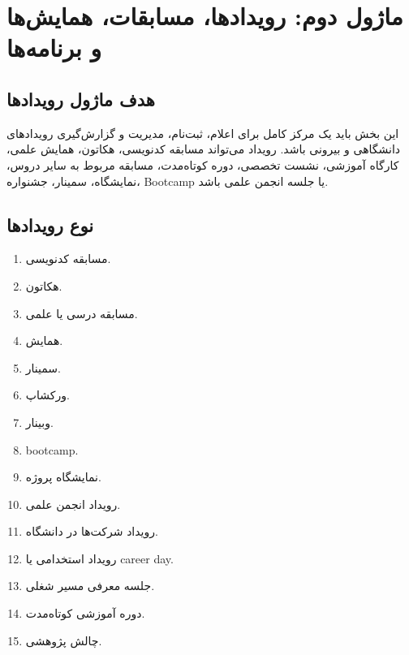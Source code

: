 \documentclass[12pt,a4paper]{article}
\begin{document}
\section{ماژول دوم: رویدادها، مسابقات، همایش‌ها و برنامه‌ها}

\subsection{هدف ماژول رویدادها}
این بخش باید یک مرکز کامل برای اعلام، ثبت‌نام، مدیریت و گزارش‌گیری رویدادهای دانشگاهی و بیرونی باشد. رویداد می‌تواند مسابقه کدنویسی، هکاتون، همایش علمی، کارگاه آموزشی، نشست تخصصی، دوره کوتاه‌مدت، مسابقه مربوط به سایر دروس، نمایشگاه، سمینار، جشنواره، Bootcamp یا جلسه انجمن علمی باشد.

\subsection{نوع رویدادها}
\begin{enumerate}
\item مسابقه کدنویسی.
\item هکاتون.
\item مسابقه درسی یا علمی.
\item همایش.
\item سمینار.
\item ورکشاپ.
\item وبینار.
\item bootcamp.
\item نمایشگاه پروژه.
\item رویداد انجمن علمی.
\item رویداد شرکت‌ها در دانشگاه.
\item رویداد استخدامی یا career day.
\item جلسه معرفی مسیر شغلی.
\item دوره آموزشی کوتاه‌مدت.
\item چالش پژوهشی.
\end{enumerate}
\end{document}
